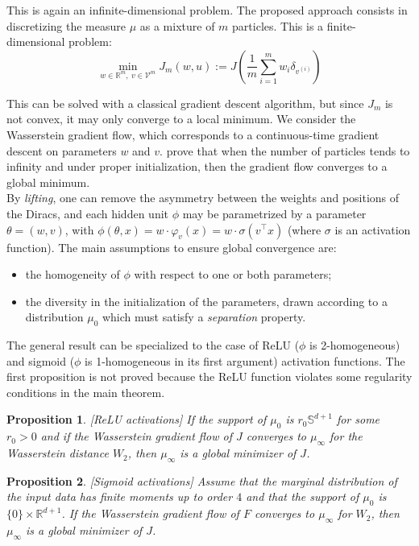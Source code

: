 \documentclass[a4paper, 11pt]{scrartcl}
\newtheorem{proposition}{Proposition}[section]
\begin{document}
{This is again an infinite-dimensional problem. The proposed approach consists in discretizing the measure $\mu$ as a mixture of $m$ particles. This is a finite-dimensional problem:
\begin{equation}
\min_{w \in \mathbb{R}^m,~v \in \mathcal{V}^m} J_m(w, u):=J\left(  \frac{1}{m} \sum_{i=1}^m w_i \delta_{v^{(i)}}\right)
\end{equation}

This can be solved with a classical gradient descent algorithm, but since $J_m$ is not convex, it may only converge to a local minimum. We consider the Wasserstein gradient flow, which corresponds to a continuous-time gradient descent on parameters $w$ and $v$. \cite{chizat2018global} prove that when the number of particles tends to infinity and under proper initialization, then the gradient flow converges to a global minimum.\\

By \textit{lifting}, one can remove the asymmetry between the weights and positions of the Diracs, and each hidden unit $\phi$ may be parametrized by a parameter $\theta = (w, v)$, with $\phi(\theta, x)=w \cdot \varphi_v(x) = w\cdot \sigma(v^\top x)$ (where $\sigma$ is an activation function). The main assumptions to ensure global convergence are:
\begin{itemize}
\item the homogeneity of $\phi$ with respect to one or both parameters;
\item the diversity in the initialization of the parameters, drawn according to a distribution $\mu_0$ which must satisfy a \textit{separation} property.\\
\end{itemize}

The general result can be specialized to the case of ReLU ($\phi$ is 2-homogeneous) and sigmoid ($\phi$ is 1-homogeneous in its first argument) activation functions. The first proposition is not proved because the ReLU function violates some regularity conditions in the main theorem.

\begin{proposition}
\emph{[ReLU activations]}
If the support of $\mu_0$ is $r_0 \mathbb{S}^{d+1}$ for some $r_0>0$ and if the Wasserstein gradient flow of $J$ converges to $\mu_\infty$ for the Wasserstein distance $W_2$, then $\mu_\infty$ is a global minimizer of $J$.
\end{proposition}

\begin{proposition}
\emph{[Sigmoid activations]}
Assume that the marginal distribution of the input data has finite moments up to order $4$ and that the support of $\mu_0$ is $\{0\} \times \mathbb{R}^{d+1}$. If the Wasserstein gradient flow of $F$ converges to $\mu_\infty$ for $W_2$, then $\mu_\infty$ is a global minimizer of $J$.
\end{proposition}

}
\end{document}
